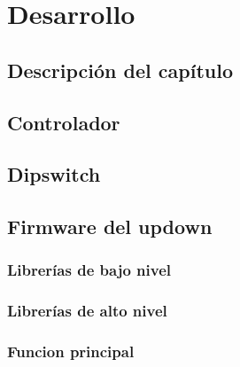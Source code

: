 \chapter{Desarrollo}
\thispagestyle{empty}

\section{Descripción del capítulo} \label{sec:\thesection}


\section{Controlador} \label{sec:\thesection}

\section{Dipswitch} \label{sec:\thesection}

\section{Firmware del updown} \label{sec:\thesection}

\subsection{Librerías de bajo nivel}

\subsection{Librerías de alto nivel}

\subsection{Funcion principal}
